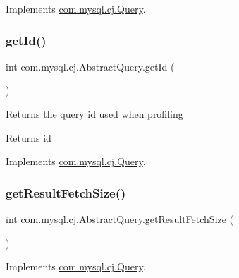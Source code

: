 Implements \mbox{\hyperlink{interfacecom_1_1mysql_1_1cj_1_1_query_a3e23446737570171c4323243ce3f9239}{com.\+mysql.\+cj.\+Query}}.

\mbox{\label{classcom_1_1mysql_1_1cj_1_1_abstract_query_a68f5ab0f91a8e8343951099d44860d36}} 
\subsubsection{\texorpdfstring{get\+Id()}{getId()}}
{\footnotesize\ttfamily int com.\+mysql.\+cj.\+Abstract\+Query.\+get\+Id (\begin{DoxyParamCaption}{ }\end{DoxyParamCaption})}

Returns the query id used when profiling

\begin{DoxyReturn}{Returns}
id 
\end{DoxyReturn}


Implements \mbox{\hyperlink{interfacecom_1_1mysql_1_1cj_1_1_query_a29f450bbae1063765d434e3b89bdd26e}{com.\+mysql.\+cj.\+Query}}.

\mbox{\label{classcom_1_1mysql_1_1cj_1_1_abstract_query_adad8ca4659c2d530cb42eac038cc0468}} 
\subsubsection{\texorpdfstring{get\+Result\+Fetch\+Size()}{getResultFetchSize()}}
{\footnotesize\ttfamily int com.\+mysql.\+cj.\+Abstract\+Query.\+get\+Result\+Fetch\+Size (\begin{DoxyParamCaption}{ }\end{DoxyParamCaption})}



Implements \mbox{\hyperlink{interfacecom_1_1mysql_1_1cj_1_1_query_a6f08d61e84781710d7e9c4680c2835b3}{com.\+mysql.\+cj.\+Query}}.

